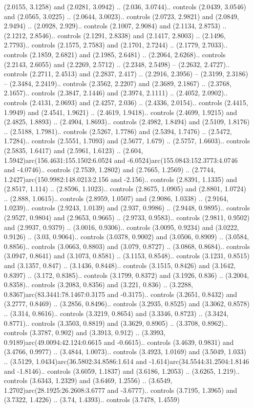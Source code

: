 (2.0155, 3.1258) and (2.0281, 3.0942) .. (2.036, 3.0744).. controls (2.0439, 3.0546) and (2.0565, 3.0225) .. (2.0644, 3.0023).. controls (2.0723, 2.9821) and (2.0849, 2.9494) .. (2.0928, 2.929).. controls (2.1007, 2.9084) and (2.1134, 2.8753) .. (2.1212, 2.8546).. controls (2.1291, 2.8338) and (2.1417, 2.8003) .. (2.1496, 2.7793).. controls (2.1575, 2.7583) and (2.1701, 2.7244) .. (2.1779, 2.7033).. controls (2.1859, 2.6821) and (2.1985, 2.6481) .. (2.2064, 2.6268).. controls (2.2143, 2.6055) and (2.2269, 2.5712) .. (2.2348, 2.5498) -- (2.2632, 2.4727).. controls (2.2711, 2.4513) and (2.2837, 2.417) .. (2.2916, 2.3956) -- (2.3199, 2.3186) -- (2.3484, 2.2419).. controls (2.3562, 2.2207) and (2.3689, 2.1867) .. (2.3768, 2.1657).. controls (2.3847, 2.1446) and (2.3974, 2.1111) .. (2.4052, 2.0902).. controls (2.4131, 2.0693) and (2.4257, 2.036) .. (2.4336, 2.0154).. controls (2.4415, 1.9949) and (2.4541, 1.9621) .. (2.4619, 1.9418).. controls (2.4699, 1.9215) and (2.4825, 1.8893) .. (2.4904, 1.8693).. controls (2.4982, 1.8494) and (2.5109, 1.8176) .. (2.5188, 1.7981).. controls (2.5267, 1.7786) and (2.5394, 1.7476) .. (2.5472, 1.7284).. controls (2.5551, 1.7093) and (2.5677, 1.679) .. (2.5757, 1.6603).. controls (2.5835, 1.6417) and (2.5961, 1.6123) .. (2.604, 1.5942)arc(156.4631:155.1502:6.0524 and -6.0524)arc(155.0843:152.3773:4.0746 and -4.0746).. controls (2.7539, 1.2802) and (2.7665, 1.2569) .. (2.7744, 1.2427)arc(150.9982:148.0213:2.156 and -2.156).. controls (2.8391, 1.1335) and (2.8517, 1.114) .. (2.8596, 1.1023).. controls (2.8675, 1.0905) and (2.8801, 1.0724) .. (2.888, 1.0615).. controls (2.8959, 1.0507) and (2.9086, 1.0338) .. (2.9164, 1.0239).. controls (2.9243, 1.0139) and (2.937, 0.9986) .. (2.9448, 0.9895).. controls (2.9527, 0.9804) and (2.9653, 0.9665) .. (2.9733, 0.9583).. controls (2.9811, 0.9502) and (2.9937, 0.9379) .. (3.0016, 0.9306).. controls (3.0095, 0.9234) and (3.0222, 0.9126) .. (3.03, 0.9064).. controls (3.0378, 0.9002) and (3.0506, 0.8909) .. (3.0584, 0.8856).. controls (3.0663, 0.8803) and (3.079, 0.8727) .. (3.0868, 0.8684).. controls (3.0947, 0.8641) and (3.1073, 0.8581) .. (3.1153, 0.8548).. controls (3.1231, 0.8515) and (3.1357, 0.847) .. (3.1436, 0.8448).. controls (3.1515, 0.8426) and (3.1642, 0.8397) .. (3.172, 0.8385).. controls (3.1799, 0.8372) and (3.1926, 0.836) .. (3.2004, 0.8358).. controls (3.2083, 0.8356) and (3.221, 0.836) .. (3.2288, 0.8367)arc(83.3441:78.1467:0.3175 and -0.3175).. controls (3.2651, 0.8432) and (3.2777, 0.8469) .. (3.2856, 0.8496).. controls (3.2935, 0.8525) and (3.3062, 0.8578) .. (3.314, 0.8616).. controls (3.3219, 0.8654) and (3.3346, 0.8723) .. (3.3424, 0.8771).. controls (3.3503, 0.8819) and (3.3629, 0.8905) .. (3.3708, 0.8962).. controls (3.3787, 0.902) and (3.3913, 0.912) .. (3.3993, 0.9189)arc(49.0094:42.124:0.6615 and -0.6615).. controls (3.4639, 0.9831) and (3.4766, 0.9977) .. (3.4844, 1.0073).. controls (3.4923, 1.0169) and (3.5049, 1.033) .. (3.5129, 1.0434)arc(36.5802:34.8586:1.614 and -1.614)arc(34.5544:31.2504:1.8146 and -1.8146).. controls (3.6059, 1.1837) and (3.6186, 1.2053) .. (3.6265, 1.219).. controls (3.6343, 1.2329) and (3.6469, 1.2556) .. (3.6549, 1.2702)arc(28.1925:26.2608:3.6777 and -3.6777).. controls (3.7195, 1.3965) and (3.7322, 1.4226) .. (3.74, 1.4393).. controls (3.7478, 1.4559) 